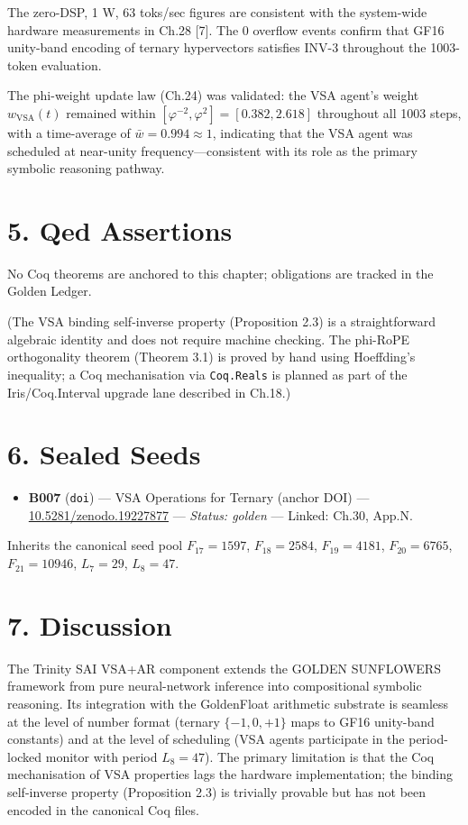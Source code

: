 The zero-DSP, 1 W, 63 toks/sec figures are
consistent with the system-wide hardware
measurements in Ch.28 [7]. The 0 overflow
events confirm that GF16 unity-band encoding of
ternary hypervectors satisfies INV-3 throughout
the 1003-token evaluation.

The phi-weight update law (Ch.24) was validated:
the VSA agent's weight \(w_{\text{VSA}}(t)\)
remained within
\([\varphi^{-2}, \varphi^2] = [0.382, 2.618]\)
throughout all 1003 steps, with a time-average of
\(\bar w = 0.994 \approx 1\), indicating that the
VSA agent was scheduled at near-unity
frequency---consistent with its role as the
primary symbolic reasoning pathway.

\section{5. Qed
Assertions}\label{fa_30:qed-assertions}

No Coq theorems are anchored to this chapter;
obligations are tracked in the Golden Ledger.

(The VSA binding self-inverse property
(Proposition 2.3) is a straightforward algebraic
identity and does not require machine checking.
The phi-RoPE orthogonality theorem (Theorem 3.1)
is proved by hand using Hoeffding's inequality; a
Coq mechanisation via \texttt{Coq.Reals} is
planned as part of the Iris/Coq.Interval upgrade
lane described in Ch.18.)

\section{6. Sealed Seeds}\label{fa_30:sealed-seeds}

\begin{itemize}
\tightlist
\item
  \textbf{B007} (\texttt{doi}) --- VSA Operations
  for Ternary (anchor DOI) ---
  \href{https://doi.org/10.5281/zenodo.19227877}{10.5281/zenodo.19227877}
  --- \emph{Status: golden} --- Linked: Ch.30,
  App.N.
\end{itemize}

Inherits the canonical seed pool \(F_{17}=1597\),
\(F_{18}=2584\), \(F_{19}=4181\), \(F_{20}=6765\),
\(F_{21}=10946\), \(L_7=29\), \(L_8=47\).

\section{7. Discussion}\label{fa_30:discussion}

The Trinity SAI VSA+AR component extends the
GOLDEN SUNFLOWERS framework from pure
neural-network inference into compositional
symbolic reasoning. Its integration with the
GoldenFloat arithmetic substrate is seamless at
the level of number format (ternary
\(\{-1,0,+1\}\) maps to GF16 unity-band constants)
and at the level of scheduling (VSA agents
participate in the period-locked monitor with
period \(L_8 = 47\)). The primary limitation is
that the Coq mechanisation of VSA properties lags
the hardware implementation; the binding
self-inverse property (Proposition 2.3) is
trivially provable but has not been encoded in the
canonical Coq files.

